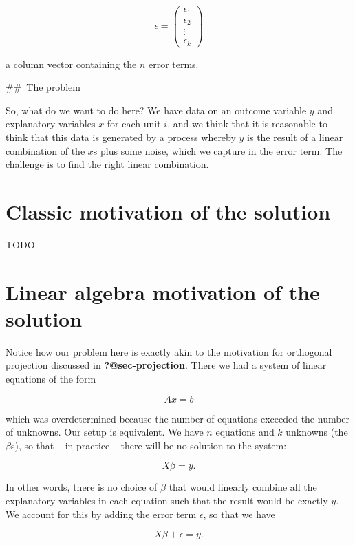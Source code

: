 \documentclass[
  letterpaper,
  DIV=11,
  numbers=noendperiod]{scrreprt}
\begin{document}
\[ \epsilon = 
 \begin{pmatrix}
  \epsilon_{1}\\
  \epsilon_{2}\\
  \vdots \\
  \epsilon_{k} 
 \end{pmatrix}
\]

a column vector containing the \(n\) error terms.

\#\#~The problem

So, what do we want to do here? We have data on an outcome variable
\(y\) and explanatory variables \(x\) for each unit \(i\), and we think
that it is reasonable to think that this data is generated by a process
whereby \(y\) is the result of a linear combination of the \(x\)s plus
some noise, which we capture in the error term. The challenge is to find
the right linear combination.

\hypertarget{classic-motivation-of-the-solution}{%
\section{Classic motivation of the
solution}\label{classic-motivation-of-the-solution}}

TODO

\hypertarget{linear-algebra-motivation-of-the-solution}{%
\section{Linear algebra motivation of the
solution}\label{linear-algebra-motivation-of-the-solution}}

Notice how our problem here is exactly akin to the motivation for
orthogonal projection discussed in \textbf{?@sec-projection}. There we
had a system of linear equations of the form

\[
Ax = b
\]

which was overdetermined because the number of equations exceeded the
number of unknowns. Our setup is equivalent. We have \(n\) equations and
\(k\) unknowns (the \(\beta\)s), so that -- in practice -- there will be
no solution to the system:

\[
X\beta = y.
\]

In other words, there is no choice of \(\beta\) that would linearly
combine all the explanatory variables in each equation such that the
result would be exactly \(y\). We account for this by adding the error
term \(\epsilon\), so that we have

\[
X\beta + \epsilon = y.
\]
\end{document}
